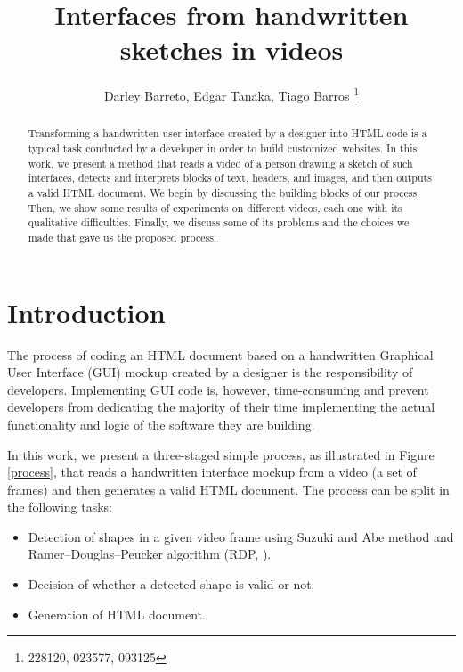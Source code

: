 \documentclass[]{IEEEtran}
\begin{document}
  \title{Interfaces from handwritten sketches in videos}
  \author{Darley Barreto, Edgar Tanaka, Tiago Barros
    \thanks{228120, 023577, 093125}
  }
  \maketitle

  \begin{abstract}
    Transforming a handwritten user interface created by a designer into HTML code is a typical task conducted by a developer in order to build customized websites. In this work, we present a method that reads a video of a person drawing a sketch of such interfaces, detects and interprets blocks of text, headers, and images, and then outputs a valid HTML document. We begin by discussing the building blocks of our process. Then, we show some results of experiments on different videos, each one with its qualitative difficulties. Finally, we discuss some of its problems and the choices we made that gave us the proposed process.
    
  \end{abstract}

  \section{Introduction}
    The process of coding an HTML document based on a handwritten Graphical User Interface (GUI) mockup created by a designer is the responsibility of developers. Implementing GUI code is, however, time-consuming and prevent developers from dedicating the majority of their time implementing the actual functionality and logic of the software they are building. 
    
    In this work, we present a three-staged simple process, as illustrated in Figure \ref{process}, that reads a handwritten interface mockup from a video (a set of frames) and then generates a valid HTML document. The process can be split in the following tasks:
    \begin{itemize}
    \item Detection of shapes in a given video frame using Suzuki and Abe \cite{suzuki85} method and Ramer–Douglas–Peucker algorithm (RDP, \cite{rdp}).
    \item Decision of whether a detected shape is valid or not.
    \item Generation of HTML document.
    \end{itemize}
    
\end{document}
